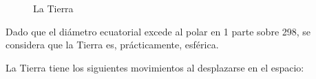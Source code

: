 \documentclass[a4paper,12pt,twoside]{article}
\begin{document}
\begin{figure}[!h]
{ \label{fig:nutacion.tierra}}

  \caption{La Tierra}
\end{figure}

Dado que el di\'ametro ecuatorial excede al polar en 1 parte sobre 298, se considera que la Tierra es, pr\'acticamente, esf\'erica. 

La Tierra tiene los siguientes movimientos al desplazarse en el espacio:
\end{document}
